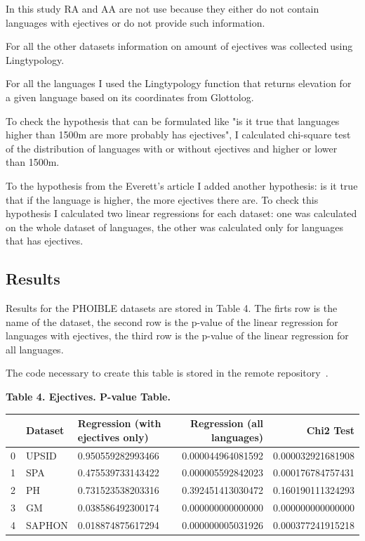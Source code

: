 \documentclass[a4paper,12pt]{article}
\begin{document}
In this study RA and AA are not use because they either do not contain languages with ejectives or do not provide such information.

For all the other datasets information on amount of ejectives was collected using Lingtypology.

For all the languages I used the Lingtypology function that returns elevation for a given language based on its coordinates from Glottolog.

To check the hypothesis that can be formulated like "is it true that languages higher than 1500m are more probably has ejectives", I calculated chi-square test of the distribution of languages with or without ejectives and higher or lower than 1500m.

To the hypothesis from the Everett's article I added another hypothesis: is it true that if the language is higher, the more ejectives there are. To check this hypothesis I calculated two linear regressions for each dataset: one was calculated on the whole dataset of languages, the other was calculated only for languages that has ejectives.

\subsection{Results}

Results for the PHOIBLE datasets are stored in Table 4. The firts row is the name of the dataset, the second row is the p-value of the linear regression for languages with ejectives, the third row is the p-value of the linear regression for all languages.

The code necessary to create this table is stored in the remote repository~\parencite{lingtypologyResearch}.

\textbf{Table 4. Ejectives. P-value Table.}

\begin{adjustbox}{max width=\textwidth}
\begin{tabular}{ l | l | l | r | r }
    ~  & Dataset  & Regression (with ejectives only)  & Regression (all languages)  & Chi2 Test \\
    \hline
    0  & UPSID  & 0.950559282993466  & 0.000044964081592  & 0.000032921681908 \\
    1  & SPA  & 0.475539733143422  & 0.000005592842023  & 0.000176784757431 \\
    2  & PH  & 0.731523538203316  & 0.392451413030472  & 0.160190111324293 \\
    3  & GM  & 0.038586492300174  & 0.000000000000000  & 0.000000000000000 \\
    4  & SAPHON  & 0.018874875617294  & 0.000000005031926  & 0.000377241915218 \\
    \hline
\end{tabular}
\end{adjustbox}
\bigskip
\end{document}
